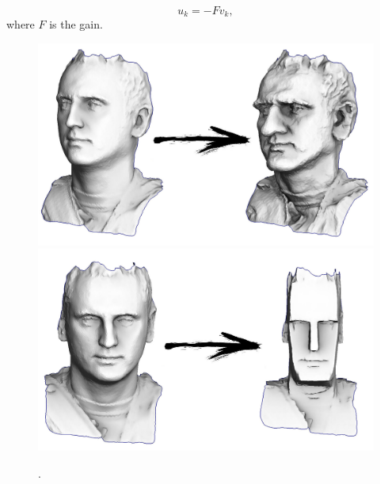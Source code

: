 \documentclass[notitlepage]{report}
\begin{document}
$$
u_k = -F v_k,
$$
where $F$ is the gain.


\begin{figure}[ht]
	\centering
    \includegraphics[width=.8\linewidth]{caricature.jpg}
	\includegraphics[width=.8\linewidth]{cubify.jpg}
	\caption{.}
	\label{fig:????}
\end{figure}
\end{document}
